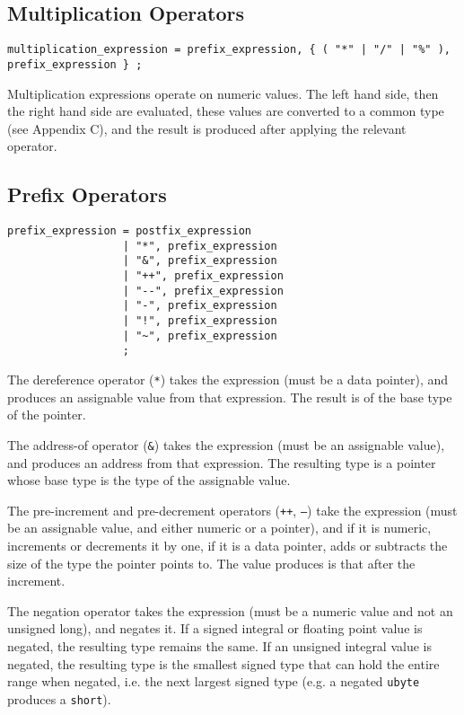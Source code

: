 \documentclass[letterpaper,12pt]{book}
\begin{document}
\subsection{Multiplication Operators}

\begin{lstlisting}[breaklines=true]
multiplication_expression = prefix_expression, { ( "*" | "/" | "%" ), prefix_expression } ;
\end{lstlisting}

Multiplication expressions operate on numeric values. The left hand side, then the right hand side are evaluated, these values are converted to a common type (see Appendix C), and the result is produced after applying the relevant operator.

\subsection{Prefix Operators}

\begin{lstlisting}[breaklines=true]
prefix_expression = postfix_expression
                  | "*", prefix_expression
                  | "&", prefix_expression
                  | "++", prefix_expression
                  | "--", prefix_expression
                  | "-", prefix_expression
                  | "!", prefix_expression
                  | "~", prefix_expression
                  ;
\end{lstlisting}

The dereference operator (\texttt{*}) takes the expression (must be a data pointer), and produces an assignable value from that expression. The result is of the base type of the pointer.

The address-of operator (\texttt{\&}) takes the expression (must be an assignable value), and produces an address from that expression. The resulting type is a pointer whose base type is the type of the assignable value.

The pre-increment and pre-decrement operators (\texttt{++}, \texttt{--}) take the expression (must be an assignable value, and either numeric or a pointer), and if it is numeric, increments or decrements it by one, if it is a data pointer, adds or subtracts the size of the type the pointer points to. The value produces is that after the increment.

The negation operator takes the expression (must be a numeric value and not an unsigned long), and negates it. If a signed integral or floating point value is negated, the resulting type remains the same. If an unsigned integral value is negated, the resulting type is the smallest signed type that can hold the entire range when negated, i.e. the next largest signed type (e.g. a negated \texttt{ubyte} produces a \texttt{short}).
\end{document}
